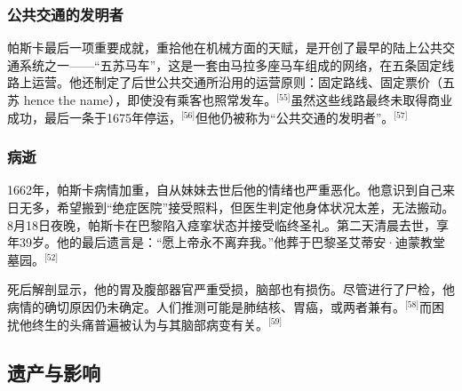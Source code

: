 \subsubsection{公共交通的发明者}
帕斯卡最后一项重要成就，重拾他在机械方面的天赋，是开创了最早的陆上公共交通系统之一——“五苏马车”，这是一套由马拉多座马车组成的网络，在五条固定线路上运营。他还制定了后世公共交通所沿用的运营原则：固定路线、固定票价（五苏 hence the name），即使没有乘客也照常发车。\(^\text{[55]}\)虽然这些线路最终未取得商业成功，最后一条于1675年停运，\(^\text{[56]}\)但他仍被称为“公共交通的发明者”。\(^\text{[57]}\)
\subsubsection{病逝}
1662年，帕斯卡病情加重，自从妹妹去世后他的情绪也严重恶化。他意识到自己来日无多，希望搬到“绝症医院”接受照料，但医生判定他身体状况太差，无法搬动。8月18日夜晚，帕斯卡在巴黎陷入痉挛状态并接受临终圣礼。第二天清晨去世，享年39岁。他的最后遗言是：“愿上帝永不离弃我。”他葬于巴黎圣艾蒂安·迪蒙教堂墓园。\(^\text{[52]}\)

死后解剖显示，他的胃及腹部器官严重受损，脑部也有损伤。尽管进行了尸检，他病情的确切原因仍未确定。人们推测可能是肺结核、胃癌，或两者兼有。\(^\text{[58]}\)而困扰他终生的头痛普遍被认为与其脑部病变有关。\(^\text{[59]}\)
\subsection{遗产与影响}
